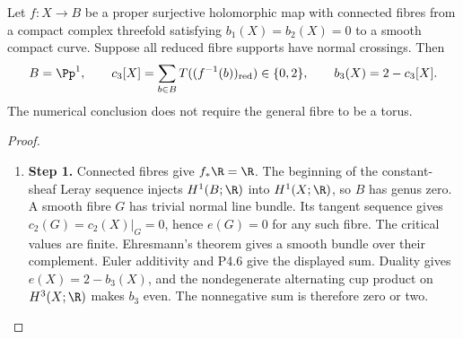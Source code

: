 \begin{proposition}[P4.7]\hypertarget{tag-02XZ}{}\label{night:P4.7}\label{stmt:P4.7}

Let $f:X\to B$ be a proper surjective holomorphic map with connected
fibres from a compact complex threefold satisfying $b_1(X)=b_2(X)=0$
to a smooth compact curve. Suppose all reduced fibre supports have
normal crossings. Then
\[
 B=\Pp^1,\qquad
 c_3[X]=\sum_{b\in B}T((f^{-1}(b))_{\mathrm{red}})\in\{0,2\},\qquad
 b_3(X)=2-c_3[X].
\]
The numerical conclusion does not require the general fibre to be a
torus.
\end{proposition}
\begin{proof}
\begin{enumerate}[label={$\langle1\rangle$\arabic*.},leftmargin=*]
\item 
\noindent\textbf{Step 1.} Connected fibres give $f_*\R=\R$. The beginning of the constant-sheaf
Leray sequence injects $H^1(B;\R)$ into $H^1(X;\R)$, so $B$ has genus
zero. A smooth fibre $G$ has trivial normal line bundle. Its tangent
sequence gives $c_2(G)=c_2(X)|_G=0$, hence $e(G)=0$ for any such fibre.
The critical values are finite. Ehresmann's theorem gives a smooth
bundle over their complement. Euler additivity and P4.6 give the
displayed sum. Duality gives $e(X)=2-b_3(X)$, and the nondegenerate
alternating cup product on $H^3(X;\R)$ makes $b_3$ even. The
nonnegative sum is therefore zero or two.

\end{enumerate}
\end{proof}